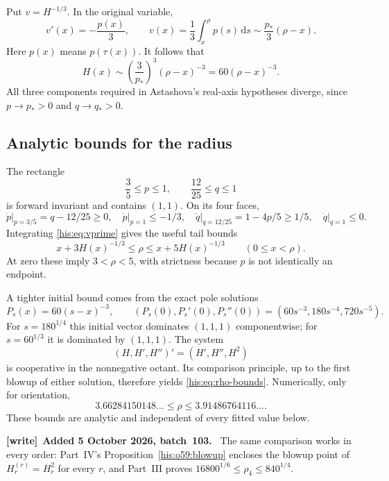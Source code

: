 \documentclass[11pt]{article}
\theoremstyle{remark}\newtheorem{remark}[theorem]{Remark}
\newcommand{\dd}{\,\mathrm d}
\numberwithin{equation}{section}
\newenvironment{writenote}[1][]{\par\smallskip\begingroup\small
 \noindent\textbf{[write]}\if\relax\detokenize{#1}\relax\else~\textbf{#1.}\fi\ }%
 {\par\endgroup\smallskip}
\begin{document}
Put $v=H^{-1/3}$. In the original variable,
\begin{equation}\label{his:eq:vprime}
 v'(x)=-\frac{p(x)}3,\qquad
 v(x)=\frac13\int_x^\rho p(s)\dd s
 \sim\frac{p_*}3(\rho-x).
\end{equation}
Here $p(x)$ means $p(\tau(x))$. It follows that
\begin{equation}\label{his:eq:real-leading}
 H(x)\sim\left(\frac3{p_*}\right)^3(\rho-x)^{-3}
       =60(\rho-x)^{-3}.
\end{equation}
All three components required in Astashova's real-axis hypotheses diverge, since $p\to p_*>0$ and $q\to q_*>0$.

\subsection{Analytic bounds for the radius}
The rectangle
\begin{equation}\label{his:eq:rectangle}
 \frac35\le p\le1,\qquad \frac{12}{25}\le q\le1
\end{equation}
is forward invariant and contains $(1,1)$. On its four faces,
\[
 \dot p\big|_{p=3/5}=q-12/25\ge0,\quad
 \dot p\big|_{p=1}\le-1/3,\quad
 \dot q\big|_{q=12/25}=1-4p/5\ge1/5,\quad
 \dot q\big|_{q=1}\le0.
\]
Integrating \eqref{his:eq:vprime} gives the useful tail bounds
\begin{equation}\label{his:eq:tail-bounds}
 x+3H(x)^{-1/3}\le\rho\le x+5H(x)^{-1/3}
 \qquad(0\le x<\rho).
\end{equation}
At zero these imply $3<\rho<5$, with strictness because $p$ is not identically an endpoint.

A tighter initial bound comes from the exact pole solutions
\[
 P_s(x)=60(s-x)^{-3},\qquad
 (P_s(0),P_s'(0),P_s''(0))=(60s^{-3},180s^{-4},720s^{-5}).
\]
For $s=180^{1/4}$ this initial vector dominates $(1,1,1)$ componentwise; for $s=60^{1/3}$ it is dominated by $(1,1,1)$. The system
\[
 (H,H',H'')'=(H',H'',H^2)
\]
is cooperative in the nonnegative octant. Its comparison principle, up to the first blowup of either solution, therefore yields \eqref{his:eq:rho-bounds}. Numerically, only for orientation,
\[
 3.66284150148\ldots\le\rho\le3.91486764116\ldots.
\]
These bounds are analytic and independent of every fitted value below.
\begin{writenote}[Added 5 October 2026, batch~103]
The same comparison works in every order: Part~IV's Proposition~\ref{his:o59:blowup} encloses the blowup point of $H_r^{(r)}=H_r^2$ for every $r$, and Part~III proves $16800^{1/6}\le\rho_4\le840^{1/4}$.
\end{writenote}
\end{document}
